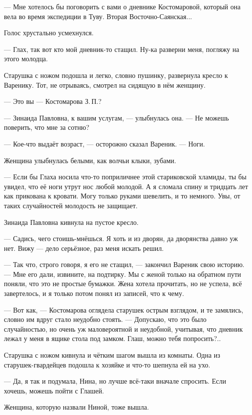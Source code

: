 --- Мне хотелось бы поговорить с вами о дневнике Костомаровой, который она вела во время экспедиции в Туву.
Вторая Восточно-Саянская...

Голос хрустально усмехнулся.

--- Глах, так вот кто мой дневник-то стащил.
Ну-ка разверни меня, погляжу на этого молодца.

Старушка с ножом подошла и легко, словно пушинку, развернула кресло к Варенику.
Тот, не отрываясь, смотрел на сидящую в нём женщину.

--- Это вы --- Костомарова З.\,П.?

--- Зинаида Павловна, к вашим услугам, --- улыбнулась она.
--- Не можешь поверить, что мне за сотню?

--- Кое-что выдаёт возраст, --- осторожно сказал Вареник.
--- Ноги.

Женщина улыбнулась белыми, как волчьи клыки, зубами.

--- Если бы Глаха носила что-то поприличнее этой стариковской хламиды, ты бы увидел, что её ноги утрут нос любой молодой.
А я сломала спину и тридцать лет как прикована к кровати.
Могу только руками шевелить, и то немного.
Увы, от таких случайностей молодость не защищает.

Зинаида Павловна кивнула на пустое кресло.

--- Садись, чего стоишь-мнёшься.
Я хоть и из дворян, да дворянства давно уж нет.
Вижу --- дело серьёзное, раз меня искать решил.

\asterism

--- Так что, строго говоря, я его не стащил, --- закончил Вареник свою историю.
--- Мне его дали, извините, на подтирку.
Мы с женой только на обратном пути поняли, что это не простые бумажки.
Жена хотела прочитать, но не успела, всё завертелось, и я только потом понял из записей, что к чему.

--- Вот как, --- Костомарова оглядела старушек острым взглядом, и те замялись, словно им вдруг стало неудобно стоять.
--- Допускаю, что это было случайностью, но очень уж маловероятной и неудобной, учитывая, что дневник лежал у меня в ящике стола под замком.
Глаш, можно тебя попросить?..

Старушка с ножом кивнула и чётким шагом вышла из комнаты.
Одна из старушек-гвардейцев подошла к хозяйке и что-то шепнула ей на ухо.

--- Да, я так и подумала, Нина, но лучше всё-таки вначале спросить.
Если хочешь, можешь пойти с Глашей.

Женщина, которую назвали Ниной, тоже вышла.

